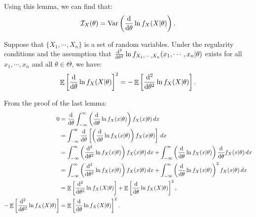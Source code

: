 \documentclass{huhtakm-template-book-v2}
\DeclareMathOperator{\E}{\mathbb{E}}
\DeclareMathOperator{\Var}{Var}
\begin{document}
    \begin{rem}
        Using this lemma, we can find that:
        \begin{equation*}
            \mathcal{I}_{X}(\theta) = \Var\left(\odv*{}{\theta} \ln{f_{X}(X | \theta)}\right).
        \end{equation*}
    \end{rem}
    \begin{lem}
        \label{Chapter 2 (Lemma) Relationship between expectation of l'' and I}
        Suppose that $\{X_{1}, \cdots, X_{n}\}$ is a set of random variables. Under the regularity conditions and the assumption that $\odv*[order={2}]{}{\theta} \ln{f_{X_{1}, \cdots, X_{n}}(x_{1}, \cdots, x_{n} | \theta)}$ exists for all $x_{1}, \cdots, x_{n}$ and all $\theta \in \Theta$, we have:
        \begin{equation*}
            \E\left[\odv*{}{\theta} \ln{f_{X}(X | \theta)}\right]^{2} = -\E\left[\odv*[order={2}]{}{\theta} \ln{f_{X}(X | \theta)}\right].
        \end{equation*}
    \end{lem}
    \begin{proofing}
        From the proof of the last lemma:
        \begin{align*}
            0 &= \odv*{}{\theta} \intinfty \left(\odv*{}{\theta} \ln{f_{X}(x | \theta)}\right) f_{X}(x | \theta) \, dx\\
            &= \intinfty \odv*{}{\theta} \left[\left(\odv*{}{\theta} \ln{f_{X}(x | \theta)}\right) f_{X}(x | \theta)\right] \, dx\\
            &= \intinfty \left(\odv*[order=2]{}{\theta} \ln{f_{X}(x | \theta)}\right) f_{X}(x | \theta) \, dx + \intinfty \left(\odv*{}{\theta} \ln{f_{X}(x | \theta)}\right) \odv*{}{\theta} f_{X}(x | \theta) \, dx\\
            &= \intinfty \left(\odv*[order=2]{}{\theta} \ln{f_{X}(x | \theta)}\right) f_{X}(x | \theta) \, dx + \intinfty \left(\odv*{}{\theta} \ln{f_{X}(x | \theta)}\right)^{2} f_{X}(x | \theta) \, dx\\
            &= \E\left[\odv*[order={2}]{}{\theta} \ln{f_{X}(X | \theta)}\right] + \E\left[\odv*{}{\theta} \ln{f_{X}(X | \theta)}\right]^{2},\\
            -\E\left[\odv*[order={2}]{}{\theta} \ln{f_{X}(X | \theta)}\right] &= \E\left[\odv*{}{\theta} \ln{f_{X}(X | \theta)}\right]^{2}.
        \end{align*}
    \end{proofing}
    \newpage
\end{document}
